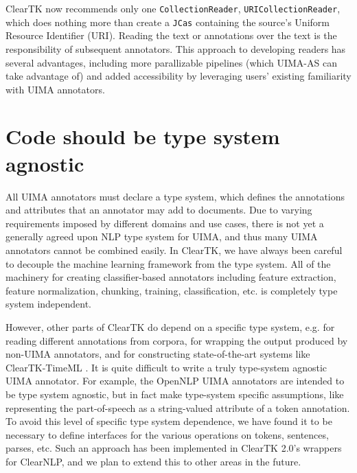 \documentclass[10pt, a4paper]{article}
\newcommand{\code}[1]{\texttt{\small #1}}
\begin{document}
ClearTK now recommends only one \code{CollectionReader}, \code{URICollectionReader}, which does nothing more than create a \code{JCas} containing the source's Uniform Resource Identifier (URI).
Reading the text or annotations over the text is the responsibility of subsequent annotators.
This approach to developing readers has several advantages, including more parallizable pipelines (which UIMA-AS can take advantage of) and added accessibility by leveraging users' existing familiarity with UIMA annotators.


\section{Code should be type system agnostic}
All UIMA annotators must declare a type system, which defines the annotations and attributes that an annotator may add to documents.
Due to varying requirements imposed by different domains and use cases, there is not yet a generally agreed upon NLP type system for UIMA, and thus many UIMA annotators cannot be combined easily.
In ClearTK, we have always been careful to decouple the machine learning framework from the type system. All of the machinery for creating classifier-based annotators including feature extraction, feature normalization, chunking, training, classification, etc. is completely type system independent.


However, other parts of ClearTK do depend on a specific type system, e.g. for reading different annotations from corpora, for wrapping the output produced by non-UIMA annotators, and for constructing state-of-the-art systems like ClearTK-TimeML \cite{bethard:2013:SemEval-2013}.
It is quite difficult to write a truly type-system agnostic UIMA annotator.
For example, the OpenNLP UIMA annotators are intended to be type system agnostic, but in fact make type-system specific assumptions, like representing the part-of-speech as a string-valued attribute of a token annotation.
To avoid this level of specific type system dependence, we have found it to be necessary to define interfaces for the various operations on tokens, sentences, parses, etc.
Such an approach has been implemented in ClearTK 2.0's wrappers for ClearNLP, and we plan to extend this to other areas in the future.
\end{document}
